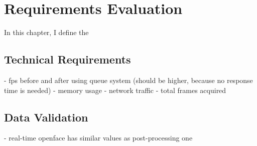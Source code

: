 
\chapter{Requirements Evaluation}\label{chapter:requirements_evaluation}
In this chapter, I define the 

\section{Technical Requirements}
- fps before and after using queue system (should be higher, because no response time is needed)
- memory usage
- network traffic
- total frames acquired

\section{Data Validation}
- real-time openface has similar values as post-processing one
